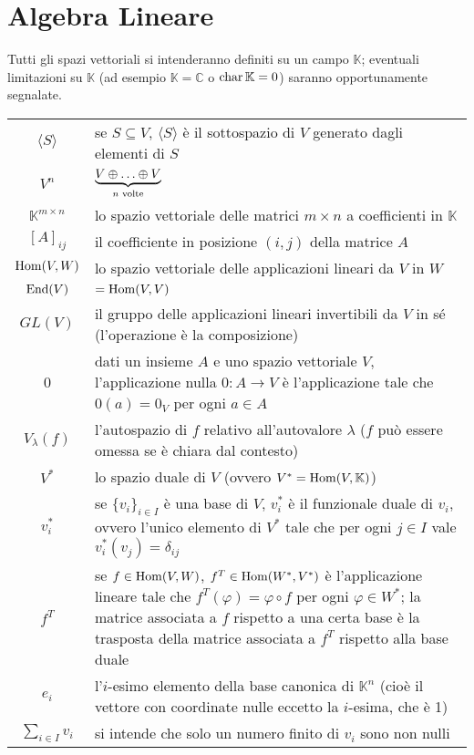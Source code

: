 \section{Algebra Lineare}
Tutti gli spazi vettoriali si intenderanno definiti su un campo $\mathbb{K}$; eventuali limitazioni su $\mathbb{K}$ (ad esempio $\mathbb{K}=\mathbb{C}$ o $\operatorname{char}\mathbb{K}=0$) saranno opportunamente segnalate.\\
\begin{tabularx}{\textwidth}{SX}
\hline
$\langle S\rangle$ & se $S\subseteq V$, $\langle S\rangle$ è il sottospazio di $V$ generato dagli elementi di $S$ \\
$V^n$ & $\underbrace{V\oplus\ldots\oplus V}_\text{$n$ volte}$\\
$\mathbb{K}^{m\times n}$ & lo spazio vettoriale delle matrici $m\times n$ a coefficienti in $\mathbb{K}$\\
$[A]_{ij}$ & il coefficiente in posizione $(i,j)$ della matrice $A$\\
$\operatorname{Hom}(V,W)$ & lo spazio vettoriale delle applicazioni lineari da $V$ in $W$\\
$\operatorname{End}(V)$ & $=\operatorname{Hom}(V,V)$ \\
$GL(V)$ & il gruppo delle applicazioni lineari invertibili da $V$ in sé (l'operazione è la composizione) \\
0 & dati un insieme $A$ e uno spazio vettoriale $V$, l'applicazione nulla $0:A\to V$ è l'applicazione tale che $0(a)=0_V$ per ogni $a\in A$ \\
$V_\lambda(f)$ & l'autospazio di $f$ relativo all'autovalore $\lambda$ ($f$ può essere omessa se è chiara dal contesto)\\
$V^*$ & lo spazio duale di $V$ (ovvero $V^*=\operatorname{Hom}(V,\mathbb{K})$) \\
$v_i^*$ & se $\{v_i\}_{i\in I}$ è una base di $V$, $v_i^*$ è il funzionale duale di $v_i$, ovvero l'unico elemento di $V^*$ tale che per ogni $j\in I$ vale $v_i^*(v_{j})=\delta_{ij}$\\
$f^T$ & se $f\in\operatorname{Hom}(V,W)$, $f^T\in\operatorname{Hom}(W^*,V^*)$ è l'applicazione lineare tale che $f^T(\varphi)=\varphi\circ f$ per ogni $\varphi\in W^*$; la matrice associata a $f$ rispetto a una certa base è la trasposta della matrice associata a $f^T$ rispetto alla base duale\\
$e_i$ & l'$i$-esimo elemento della base canonica di $\mathbb{K}^n$ (cioè il vettore con coordinate nulle eccetto la $i$-esima, che è 1)\\
$\sum_{i\in I}v_i$ & si intende che solo un numero finito di $v_i$ sono non nulli\\
\hline
\end{tabularx}

